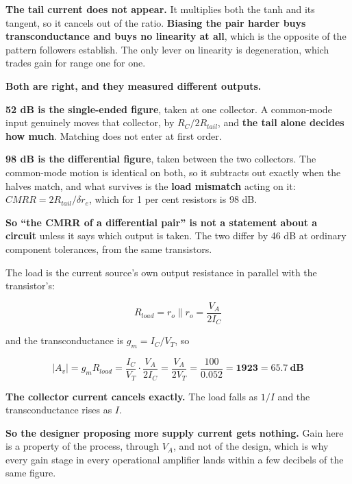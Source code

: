 \textbf{The tail current does not appear.} It multiplies both the tanh and its tangent, so it cancels out of the ratio. \textbf{Biasing the pair harder buys transconductance and buys no linearity at all}, which is the opposite of the pattern followers establish. The only lever on linearity is degeneration, which trades gain for range one for one.


\textbf{Both are right, and they measured different outputs.}

\textbf{52 dB is the single-ended figure}, taken at one collector. A common-mode input genuinely moves that collector, by $R_C/2R_{tail}$, and \textbf{the tail alone decides how much}. Matching does not enter at first order.

\textbf{98 dB is the differential figure}, taken between the two collectors. The common-mode motion is identical on both, so it subtracts out exactly when the halves match, and what survives is the \textbf{load mismatch} acting on it: $CMRR = 2R_{tail}/\delta r_e$, which for 1 per cent resistors is 98 dB.

\textbf{So ``the CMRR of a differential pair'' is not a statement about a circuit} unless it says which output is taken. The two differ by 46 dB at ordinary component tolerances, from the same transistors.



The load is the current source's own output resistance in parallel with the transistor's:

\[
  R_{load} = r_o \parallel r_o = \frac{V_A}{2I_C}
\]

and the transconductance is $g_m = I_C/V_T$, so

\[
  |A_v| = g_m R_{load} = \frac{I_C}{V_T}\cdot\frac{V_A}{2I_C}
  = \boxed{\frac{V_A}{2V_T}} = \frac{100}{0.052} = \mathbf{1923} = \mathbf{65.7\ \text{dB}}
\]

\textbf{The collector current cancels exactly.} The load falls as $1/I$ and the transconductance rises as $I$.

\textbf{So the designer proposing more supply current gets nothing.} Gain here is a property of the process, through $V_A$, and not of the design, which is why every gain stage in every operational amplifier lands within a few decibels of the same figure.


